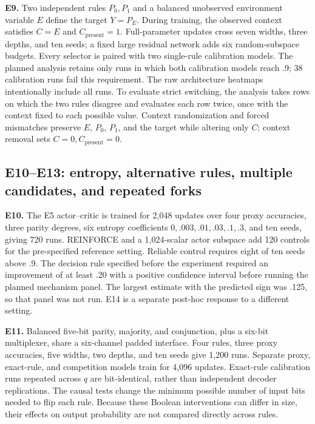 \textbf{E9.} Two independent rules $P_0,P_1$ and a balanced unobserved environment variable $E$ define the target $Y=P_E$. During training, the observed context satisfies $C=E$ and $C_{\mathrm{present}}=1$. Full-parameter updates cross seven widths, three depths, and ten seeds; a fixed large residual network adds six random-subspace budgets. Every selector is paired with two single-rule calibration models. The planned analysis retains only runs in which both calibration models reach .9; 38 calibration runs fail this requirement. The raw architecture heatmaps intentionally include all runs. To evaluate strict switching, the analysis takes rows on which the two rules disagree and evaluates each row twice, once with the context fixed to each possible value. Context randomization and forced mismatches preserve $E$, $P_0$, $P_1$, and the target while altering only $C$; context removal sets $C=0,C_{\mathrm{present}}=0$.

\subsection{E10--E13: entropy, alternative rules, multiple candidates, and repeated forks}

\textbf{E10.} The E5 actor--critic is trained for 2,048 updates over four proxy accuracies, three parity degrees, six entropy coefficients $0,.003,.01,.03,.1,.3$, and ten seeds, giving 720 runs. REINFORCE and a 1,024-scalar actor subspace add 120 controls for the pre-specified reference setting. Reliable control requires eight of ten seeds above .9. The decision rule specified before the experiment required an improvement of at least .20 with a positive confidence interval before running the planned mechanism panel. The largest estimate with the predicted sign was .125, so that panel was not run. E14 is a separate post-hoc response to a different setting.

\textbf{E11.} Balanced five-bit parity, majority, and conjunction, plus a six-bit multiplexer, share a six-channel padded interface. Four rules, three proxy accuracies, five widths, two depths, and ten seeds give 1,200 runs. Separate proxy, exact-rule, and competition models train for 4,096 updates. Exact-rule calibration runs repeated across $q$ are bit-identical, rather than independent decoder replications. The causal tests change the minimum possible number of input bits needed to flip each rule. Because these Boolean interventions can differ in size, their effects on output probability are not compared directly across rules.

